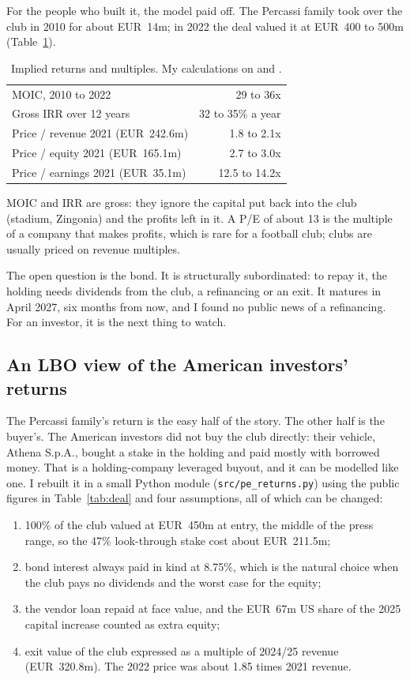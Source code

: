 \documentclass[11pt,a4paper]{article}
\begin{document}
For the people who built it, the model paid off. The Percassi family took over the club in 2010 for about EUR~14m; in 2022 the deal valued it at EUR~400 to 500m (Table~\ref{tab:multiples}).

\begin{table}[H]\centering\small
\caption{Implied returns and multiples. My calculations on \citet{ilfoglio} and \citet{cef_2021}.}\label{tab:multiples}
\begin{tabular}{lr}
\toprule
MOIC, 2010 to 2022 & 29 to 36x \\
Gross IRR over 12 years & 32 to 35\% a year \\
Price / revenue 2021 (EUR~242.6m) & 1.8 to 2.1x \\
Price / equity 2021 (EUR~165.1m) & 2.7 to 3.0x \\
Price / earnings 2021 (EUR~35.1m) & 12.5 to 14.2x \\
\bottomrule
\end{tabular}
\end{table}

MOIC and IRR are gross: they ignore the capital put back into the club (stadium, Zingonia) and the profits left in it. A P/E of about 13 is the multiple of a company that makes profits, which is rare for a football club; clubs are usually priced on revenue multiples.

The open question is the bond. It is structurally subordinated: to repay it, the holding needs dividends from the club, a refinancing or an exit. It matures in April 2027, six months from now, and I found no public news of a refinancing. For an investor, it is the next thing to watch.

\subsection{An LBO view of the American investors' returns}
The Percassi family's return is the easy half of the story. The other half is the buyer's. The American investors did not buy the club directly: their vehicle, Athena S.p.A., bought a stake in the holding and paid mostly with borrowed money. That is a holding-company leveraged buyout, and it can be modelled like one. I rebuilt it in a small Python module (\texttt{src/pe\_returns.py}) using the public figures in Table~\ref{tab:deal} and four assumptions, all of which can be changed:
\begin{enumerate}[leftmargin=1.5em,itemsep=2pt]
\item 100\% of the club valued at EUR~450m at entry, the middle of the press range, so the 47\% look-through stake cost about EUR~211.5m;
\item bond interest always paid in kind at 8.75\%, which is the natural choice when the club pays no dividends and the worst case for the equity;
\item the vendor loan repaid at face value, and the EUR~67m US share of the 2025 capital increase counted as extra equity;
\item exit value of the club expressed as a multiple of 2024/25 revenue (EUR~320.8m). The 2022 price was about 1.85 times 2021 revenue.
\end{enumerate}
\end{document}
